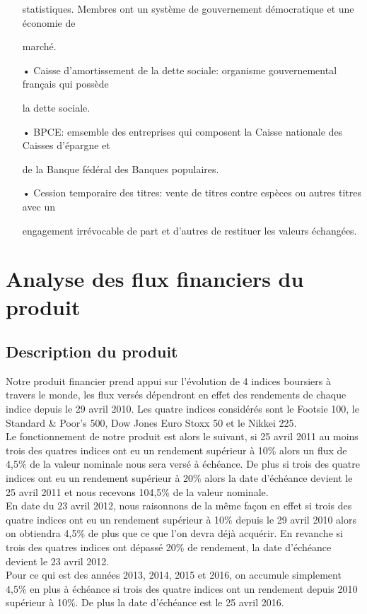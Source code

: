 \documentclass[french,12pt,a4paper]{article}
\begin{document}
\begin{itemize}
statistiques. Membres ont un système de gouvernement démocratique et une économie de 

marché.

\item[•]
Caisse d’amortissement de la dette sociale: organisme gouvernemental français qui possède 

la dette sociale.

\item[•]
BPCE: emsemble des entreprises qui composent la Caisse nationale des Caisses d’épargne et 

de la Banque fédéral des Banques populaires.

\item[•]
Cession temporaire des titres: vente de titres contre espèces ou autres titres avec un 

engagement irrévocable de part et d’autres de restituer les valeurs échangées.
\end{itemize}

\section{Analyse des flux financiers du produit}

\subsection{Description du produit}

Notre produit financier prend appui sur l'évolution de 4 indices boursiers à travers le monde, les flux versés dépendront en effet des rendements de chaque indice depuis le 29 avril 2010.
Les quatre indices considérés sont le Footsie 100, le Standard \& Poor's 500, Dow Jones Euro Stoxx 50 et le Nikkei 225.\\
Le fonctionnement de notre produit est alors le suivant, si 25 avril 2011 au moins trois des quatres indices ont eu un rendement supérieur à 10\% alors un flux de 4,5\% de la valeur nominale nous sera versé à échéance. De plus si trois des quatre indices ont eu un rendement supérieur à 20\% alors la date d'échéance devient le 25 avril 2011 et nous recevons 104,5\% de la valeur nominale.\\
En date du 23 avril 2012, nous raisonnons de la même façon en effet si trois des quatre indices ont eu un rendement supérieur à 10\% depuis le 29 avril 2010 alors on obtiendra 4,5\% de plus que ce que l'on devra déjà acquérir. En revanche si trois des quatres indices ont dépassé 20\% de rendement, la date d'échéance devient le 23 avril 2012.\\
Pour ce qui est des années 2013, 2014, 2015 et 2016, on accumule simplement 4,5\% en plus à échéance si trois des quatre indices ont un rendement depuis 2010 supérieur à 10\%. De plus la date d'échéance est le 25 avril 2016.\\
\end{document}

